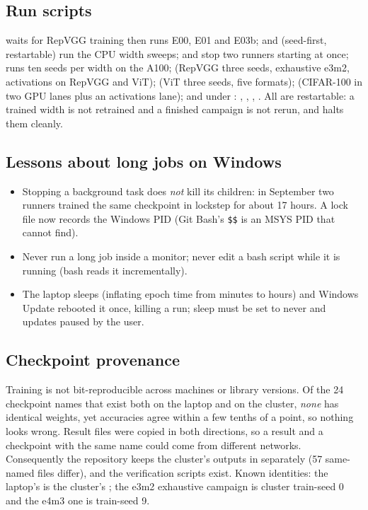 \subsection{Run scripts}
 waits for RepVGG training then runs E00, E01 and E03b;  and  (seed-first, restartable) run the CPU width sweeps;  and  stop two runners starting at once;
 runs ten seeds per width on the A100;  (RepVGG three seeds, exhaustive e3m2, activations on RepVGG and ViT);  (ViT three seeds, five formats);  (CIFAR-100 in two GPU lanes plus an activations lane);
and under : , , , . All are restartable: a trained width is not retrained and a finished campaign is not rerun, and  halts them cleanly.

\subsection{Lessons about long jobs on Windows}
\begin{itemize}
\item Stopping a background task does \emph{not} kill its children: in September two runners trained the same checkpoint in lockstep for about 17 hours. A lock file now records the Windows PID (Git Bash's \texttt{\$\$} is an MSYS PID that  cannot find).
\item Never run a long job inside a monitor; never edit a bash script while it is running (bash reads it incrementally).
\item The laptop sleeps (inflating epoch time from minutes to hours) and Windows Update rebooted it once, killing a run; sleep must be set to never and updates paused by the user.
\end{itemize}

\subsection{Checkpoint provenance}
Training is not bit-reproducible across machines or library versions. Of the 24 checkpoint names that exist both on the laptop and on the cluster, \emph{none} has identical weights, yet accuracies agree within a few tenths of a point, so nothing looks wrong. Result files were copied in both directions, so a result and a checkpoint with the same name could come from different networks.
Consequently the repository keeps the cluster's outputs in  separately (57 same-named files differ), and the verification scripts exist. Known identities: the laptop's  is the cluster's ; the e3m2 exhaustive campaign is cluster train-seed 0 and the e4m3 one is train-seed 9.

